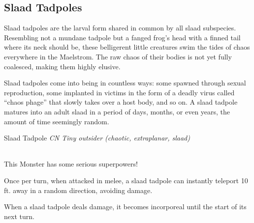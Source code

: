 \subsection{Slaad Tadpoles \cite{tadpole}}
Slaad tadpoles are the larval form shared in common by all slaad subspecies. Resembling not a mundane tadpole but a fanged frog’s head with a finned tail where its neck should be, these belligerent little creatures swim the tides of chaos everywhere in the Maelstrom. The raw chaos of their bodies is not yet fully coalesced, making them highly elusive.

Slaad tadpoles come into being in countless ways: some spawned through sexual reproduction, some implanted in victims in the form of a deadly virus called “chaos phage” that slowly takes over a host body, and so on. A slaad tadpole matures into an adult slaad in a period of days, months, or even years, the amount of time seemingly random.

\begin{monsterbox}{Slaad Tadpole}
	\textit{CN Tiny outsider (chaotic, extraplanar, slaad)}\\
	\hline
	\basics[%
	armorclass = 14,
	hitpoints  = 26,
	speed      = 10 ft
	]
	\hline
	\stats[
	STR = \stat{13}, %
	DEX = \stat{14},
	CON = \stat{12},
	INT = \stat{3},
	WIS = \stat{10},
	CHA = \stat{11}
	]
	\hline
	\details[%
	senses = {Darkvision 60 ft., Perception +7},
	languages = {Slaad},
	damageimmunities = {Sonic},
	damageresistances = {Acid, Cold, Elecricity, Fire},
	conditionimmunities = {Charmed},
	challenge = 2
	]
	\hline \\[1mm]
	\begin{monsteraction}
		This Monster has some serious superpowers!
	\end{monsteraction}
	\begin{monsteraction}
		Once per turn, when attacked in melee, a slaad tadpole can instantly teleport 10 ft. away in a random direction, avoiding damage.
	\end{monsteraction}

	\begin{monsteraction}[Fade (Su)]
	When a slaad tadpole deals damage, it becomes incorporeal until the start of its next turn.
	\end{monsteraction}
\end{monsterbox}
